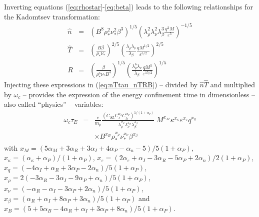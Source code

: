 \documentclass[12pt]{iopart}
\begin{document}
Inverting equations (\ref{eq:rhostar}-\ref{eq:beta}) leads to the following relationships for the Kadomtsev transformation: 
\begin{eqnarray}
 \widehat n &=& \left( B^8\rho_*^2\nu_*^2\beta^3 \right)^{1/5}
 \left( \lambda_\rho^2\lambda_\nu^2\lambda_\beta^3 \frac{q^2 M}{\varepsilon^5} \right)^{-1/5}
 \label{eq:n_rho_nu_beta} \\
 \widehat T &=& \left( \frac{B\beta}{\rho_*\nu_*} \right)^{2/5}
 \left(\frac{\lambda_\rho\lambda_\nu}{\lambda_\beta} 
 \frac{q M^{1/2}}{\varepsilon^{5/2}} \right)^{2/5}
 \label{eq:T_rho_nu_beta} \\
 R &=& \left( \frac{\beta}{\rho_*^6\nu_*B^4} \right)^{1/5}
 \left(\frac{\lambda_\rho^6\lambda_\nu}{\lambda_\beta} 
 \frac{q M^3}{\varepsilon^{15/2}} \right)^{1/5}
 \label{eq:R_rho_nu_beta}
\end{eqnarray}
Injecting these expressions in (\ref{eq:nTtau_nTRB}) -- divided by $\widehat n\widehat T$ and multiplied by $\omega_c$ -- provides the expression of the energy confinement time in dimensionless -- also called ``physics'' -- variables:
\begin{eqnarray}
 \omega_c\tau_E &=& \frac{e}{m_p} 
\frac{\left( C_{SL} C_I^{\alpha_I}C_{tr}^{\alpha_P}\right)^{1/(1+\alpha_P)}}
{\lambda_\rho^{x_\rho} \lambda_\nu^{x_\nu} \lambda_\beta^{x_\beta}} \;
M^{x_M} \kappa^{x_\kappa} \varepsilon^{x_\varepsilon} q^{x_q} \nonumber \\
&& \times  B^{x_B} \rho_*^{x_\rho} \nu_*^{x_\nu} \beta^{x_\beta}
\end{eqnarray}
with 
$x_M = (5\alpha_M+3\alpha_R+3\alpha_I+4\alpha_P-\alpha_n-5)/5(1+\alpha_P)$, 
$x_\kappa = (\alpha_\kappa+\alpha_P)/(1+\alpha_P)$, 
$x_\varepsilon = (2\alpha_\varepsilon+\alpha_I-3\alpha_R-5\alpha_P+2\alpha_n)/2(1+\alpha_P)$, 
$x_q = (-4\alpha_I+\alpha_R+3\alpha_P-2\alpha_n)/5(1+\alpha_P)$, 
$x_\rho = 2(-3\alpha_R-3\alpha_I-9\alpha_P+\alpha_n)/5(1+\alpha_P)$, 
$x_\nu = (-\alpha_R-\alpha_I-3\alpha_P+2\alpha_n)/5(1+\alpha_P)$, 
$x_\beta = (\alpha_R+\alpha_I+8\alpha_P+3\alpha_n)/5(1+\alpha_P)$ and 
$x_B = (5+5\alpha_B-4\alpha_R+\alpha_I+3\alpha_P+8\alpha_n)/5(1+\alpha_P)$.
\end{document}
